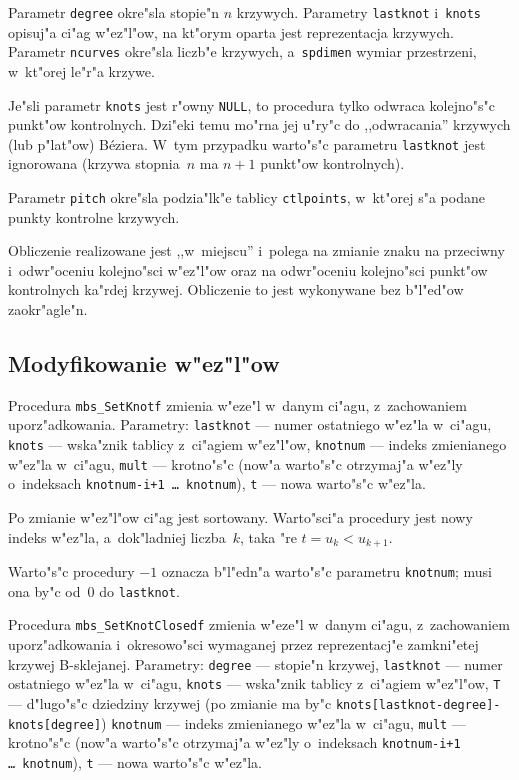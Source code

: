 Parametr \texttt{degree} okre"sla stopie"n $n$ krzywych. Parametry
\texttt{lastknot} i~\texttt{knots} opisuj"a ci"ag w"ez"l"ow, na kt"orym
oparta jest reprezentacja krzywych. Parametr \texttt{ncurves} okre"sla
liczb"e krzywych, a~\texttt{spdimen} wymiar przestrzeni, w~kt"orej le"r"a
krzywe.

Je"sli parametr \texttt{knots} jest r"owny \texttt{NULL}, to procedura tylko
odwraca kolejno"s"c punkt"ow kontrolnych. Dzi"eki temu mo"rna jej u"ry"c do
,,odwracania'' krzywych (lub p"lat"ow) B\'{e}ziera. W~tym przypadku
warto"s"c parametru \texttt{lastknot} jest ignorowana (krzywa stopnia~$n$ ma
$n+1$ punkt"ow kontrolnych).

Parametr \texttt{pitch} okre"sla podzia"lk"e tablicy \texttt{ctlpoints},
w~kt"orej s"a podane punkty kontrolne krzywych.

Obliczenie realizowane jest ,,w~miejscu'' i~polega na zmianie znaku na
przeciwny i~odwr"oceniu kolejno"sci w"ez"l"ow oraz na odwr"oceniu
kolejno"sci punkt"ow kontrolnych ka"rdej krzywej. Obliczenie to jest
wykonywane bez b"l"ed"ow zaokr"agle"n.


\newpage
\subsection{Modyfikowanie w"ez"l"ow}

Procedura \texttt{mbs\_SetKnotf} zmienia w"eze"l w~danym ci"agu,
z~zachowaniem uporz"adkowania. Parametry:
\texttt{lastknot} --- numer ostatniego w"ez"la w~ci"agu, \texttt{knots} ---
wska"znik tablicy z~ci"agiem w"ez"l"ow, \texttt{knotnum} --- indeks zmienianego
w"ez"la w~ci"agu, \texttt{mult} --- krotno"s"c (now"a warto"s"c otrzymaj"a
w"ez"ly o~indeksach \texttt{knotnum-i+1 \ldots\ knotnum}),
\texttt{t} --- nowa warto"s"c w"ez"la.

Po zmianie w"ez"l"ow ci"ag jest sortowany. Warto"sci"a procedury jest
nowy indeks w"ez"la, a~dok"ladniej liczba~$k$, taka "re $t=u_k<u_{k+1}$.

Warto"s"c procedury $-1$ oznacza b"l"edn"a warto"s"c parametru \texttt{knotnum};
musi ona by"c od~$0$ do \texttt{lastknot}.


\vspace{\bigskipamount}
Procedura \texttt{mbs\_SetKnotClosedf} zmienia w"eze"l w~danym ci"agu,
z~zachowaniem uporz"adkowania i~okresowo"sci wymaganej przez reprezentacj"e
zamkni"etej krzywej B-sklejanej. Parametry: \texttt{degree} --- stopie"n krzywej,
\texttt{lastknot} --- numer ostatniego w"ez"la w~ci"agu, \texttt{knots} ---
wska"znik tablicy z~ci"agiem w"ez"l"ow, \texttt{T} --- d"lugo"s"c dziedziny
krzywej (po zmianie ma by"c \texttt{knots[lastknot-degree]-knots[degree]})
 \texttt{knotnum} --- indeks zmienianego
w"ez"la w~ci"agu, \texttt{mult} --- krotno"s"c (now"a warto"s"c otrzymaj"a
w"ez"ly o~indeksach \texttt{knotnum-i+1 \ldots\ knotnum}),
\texttt{t} --- nowa warto"s"c w"ez"la.

